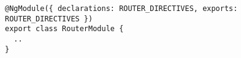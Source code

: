 \begin{verbatim}
@NgModule({ declarations: ROUTER_DIRECTIVES, exports: ROUTER_DIRECTIVES })
export class RouterModule {
  ..
}
\end{verbatim}
